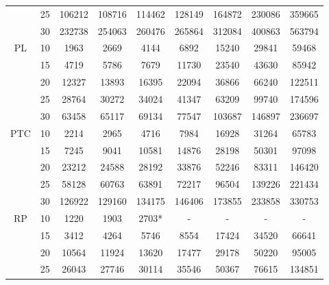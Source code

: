 \begin{table}[]
{\begin{tabular}{|c|c|ccccccc|}
&25                                                           & 106212  & 108716 & 114462 & 128149 & 164872 & 230086 & 359665  \\
&30                                                           & 232738 &  254063 &  260476 & 265864 & 312084 & 400863 & 563794  \\
\hline
\hline
\multirow{5}{*}{PL} &10                                       & 1963 & 2669  & 4144  & 6892 & 15240 & 29841 & 59468  \\
&15                                                           & 4719  & 5786  & 7679  & 11730  & 23540  & 43630  & 85942  \\
&20                                                           & 12327 & 13893  & 16395  & 22094  & 36866 & 66240  & 122511  \\
&25                                                           & 28764  & 30272  & 34024 & 41347  & 63209  & 99740  & 174596 \\
&30                                                           & 63458  & 65117  & 69134 & 77547  & 103687  & 146897  & 236697  \\
\hline
\hline
\multirow{5}{*}{PTC} &10                                      & 2214 & 2965  & 4716  & 7984 & 16928 & 31264 & 65783    \\
&15                                                           & 7245  & 9041  & 10581  & 14876  & 28198  & 50301  & 97098  \\
&20                                                           & 23212 & 24588  & 28192  & 33876  & 52246 & 83311  & 146420  \\
&25                                                           & 58128  & 60763  & 63891 & 72217  & 96504  & 139226  & 221434 \\
&30                                                           & 126922  & 129160  & 134175 & 146406  & 173855  & 233858  & 330753  \\
\hline
\hline
\multirow{5}{*}{RP} &10                                       & 1220 & 1903  & 2703*  & - & - & - & -    \\
&15                                                           & 3412  & 4264  & 5746  & 8554  & 17424  & 34520  & 66641  \\
&20                                                           & 10564 & 11924  & 13620  & 17477  & 29178 & 50220  & 95005  \\
&25                                                           & 26043  & 27746  & 30114 & 35546  & 50367  & 76615  & 134851 \\

\end{tabular}}
\end{table}
